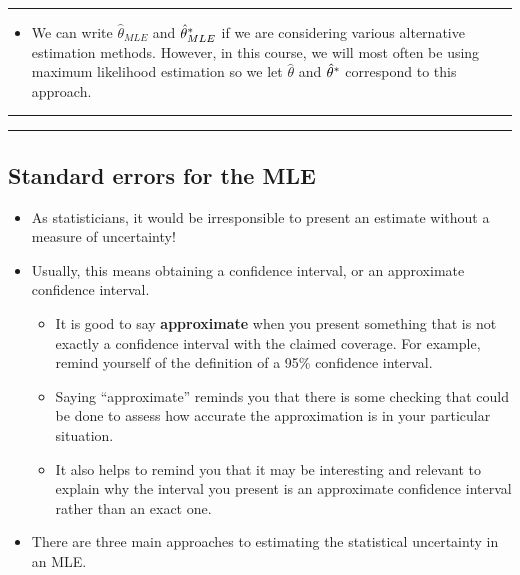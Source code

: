 \documentclass[]{article}
\providecommand{\tightlist}{%
  \setlength{\itemsep}{0pt}\setlength{\parskip}{0pt}}
\begin{document}
\begin{center}\rule{0.5\linewidth}{\linethickness}\end{center}

\begin{itemize}
\tightlist
\item
  We can write \(\hat\theta_{MLE}\) and \(\hat\theta_{MLE}^*\)
  if we are considering various alternative estimation methods. However,
  in this course, we will most often be using maximum likelihood
  estimation so we let \(\hat\theta\) and \(\hat\theta^*\)
  correspond to this approach.
\end{itemize}

\begin{center}\rule{0.5\linewidth}{\linethickness}\end{center}

\begin{center}\rule{0.5\linewidth}{\linethickness}\end{center}

\subsection{Standard errors for the
MLE}\label{standard-errors-for-the-mle}

\begin{itemize}
\item
  As statisticians, it would be irresponsible to present an estimate
  without a measure of uncertainty!
\item
  Usually, this means obtaining a confidence interval, or an approximate
  confidence interval.

  \begin{itemize}
  \item
    It is good to say \textbf{approximate} when you present something
    that is not exactly a confidence interval with the claimed coverage.
    For example, remind yourself of the definition of a 95\% confidence
    interval.
  \item
    Saying ``approximate'' reminds you that there is some checking that
    could be done to assess how accurate the approximation is in your
    particular situation.
  \item
    It also helps to remind you that it may be interesting and relevant
    to explain why the interval you present is an approximate confidence
    interval rather than an exact one.
  \end{itemize}
\item
  There are three main approaches to estimating the statistical
  uncertainty in an MLE.
\end{itemize}
\end{document}
